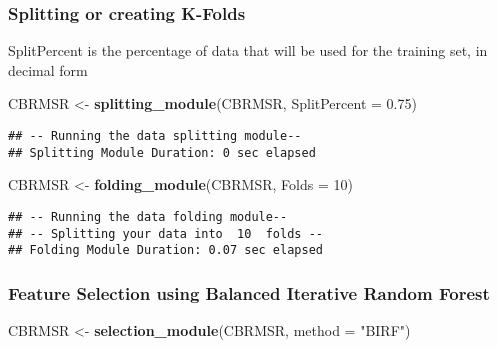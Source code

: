 \documentclass[
]{article}
\newenvironment{Shaded}{\begin{snugshade}}{\end{snugshade}}
\newcommand{\DataTypeTok}[1]{\textcolor[rgb]{0.13,0.29,0.53}{#1}}
\newcommand{\DecValTok}[1]{\textcolor[rgb]{0.00,0.00,0.81}{#1}}
\newcommand{\FloatTok}[1]{\textcolor[rgb]{0.00,0.00,0.81}{#1}}
\newcommand{\KeywordTok}[1]{\textcolor[rgb]{0.13,0.29,0.53}{\textbf{#1}}}
\newcommand{\NormalTok}[1]{#1}
\newcommand{\StringTok}[1]{\textcolor[rgb]{0.31,0.60,0.02}{#1}}
\begin{document}
\hypertarget{splitting-or-creating-k-folds}{%
\subsubsection{Splitting or creating
K-Folds}\label{splitting-or-creating-k-folds}}

SplitPercent is the percentage of data that will be used for the
training set, in decimal form

\begin{Shaded}
\begin{Highlighting}[]
\NormalTok{CBRMSR <-}\StringTok{ }\KeywordTok{splitting_module}\NormalTok{(CBRMSR, }\DataTypeTok{SplitPercent =} \FloatTok{0.75}\NormalTok{)}
\end{Highlighting}
\end{Shaded}

\begin{verbatim}
## -- Running the data splitting module-- 
## Splitting Module Duration: 0 sec elapsed
\end{verbatim}

\begin{Shaded}
\begin{Highlighting}[]
\NormalTok{CBRMSR <-}\StringTok{ }\KeywordTok{folding_module}\NormalTok{(CBRMSR, }\DataTypeTok{Folds =} \DecValTok{10}\NormalTok{)}
\end{Highlighting}
\end{Shaded}

\begin{verbatim}
## -- Running the data folding module-- 
## -- Splitting your data into  10  folds -- 
## Folding Module Duration: 0.07 sec elapsed
\end{verbatim}

\hypertarget{feature-selection-using-balanced-iterative-random-forest}{%
\subsubsection{Feature Selection using Balanced Iterative Random
Forest}\label{feature-selection-using-balanced-iterative-random-forest}}

\begin{Shaded}
\begin{Highlighting}[]
\NormalTok{CBRMSR <-}\StringTok{ }\KeywordTok{selection_module}\NormalTok{(CBRMSR, }\DataTypeTok{method =} \StringTok{"BIRF"}\NormalTok{)}
\end{Highlighting}
\end{Shaded}
\end{document}
